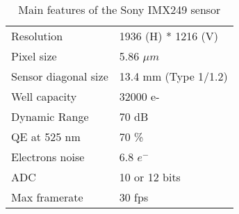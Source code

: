 \begin{table}[!h]
  \centering
  \caption{Main features of the Sony IMX249 sensor}
  \label{tab:IMX249}
  \begin{tabular}{ll}
    \toprule
    Resolution           & 1936 (H) * 1216 (V)  \\
    Pixel size           & 5.86 $\mu m$         \\
    Sensor diagonal size & 13.4 mm (Type 1/1.2) \\
    Well capacity        & 32000 e-             \\
    Dynamic Range        & 70 dB                \\
    QE at 525 nm         & 70 \%                \\
    Electrons noise      & 6.8 $e^{-}$          \\
    ADC                  & 10 or 12 bits        \\
    Max framerate        & 30 fps               \\
    \bottomrule
  \end{tabular}
\end{table}
